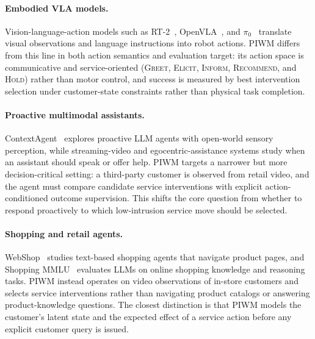 
\paragraph{Embodied VLA models.}
Vision-language-action models such as RT-2~\cite{brohan2023rt2}, OpenVLA~\cite{kim2024openvla}, and $\pi_0$~\cite{black2024pi0} translate visual observations and language instructions into robot actions. PIWM differs from this line in both action semantics and evaluation target: its action space is communicative and service-oriented (\textsc{Greet}, \textsc{Elicit}, \textsc{Inform}, \textsc{Recommend}, and \textsc{Hold}) rather than motor control, and success is measured by best intervention selection under customer-state constraints rather than physical task completion.

\paragraph{Proactive multimodal assistants.}
ContextAgent~\cite{yang2026contextagent} explores proactive LLM agents with open-world sensory perception, while streaming-video and egocentric-assistance systems study when an assistant should speak or offer help. PIWM targets a narrower but more decision-critical setting: a third-party customer is observed from retail video, and the agent must compare candidate service interventions with explicit action-conditioned outcome supervision. This shifts the core question from whether to respond proactively to which low-intrusion service move should be selected.

\paragraph{Shopping and retail agents.}
WebShop~\cite{yao2022webshop} studies text-based shopping agents that navigate product pages, and Shopping MMLU~\cite{jin2024shoppingmmlu} evaluates LLMs on online shopping knowledge and reasoning tasks. PIWM instead operates on video observations of in-store customers and selects service interventions rather than navigating product catalogs or answering product-knowledge questions. The closest distinction is that PIWM models the customer's latent state and the expected effect of a service action before any explicit customer query is issued.

